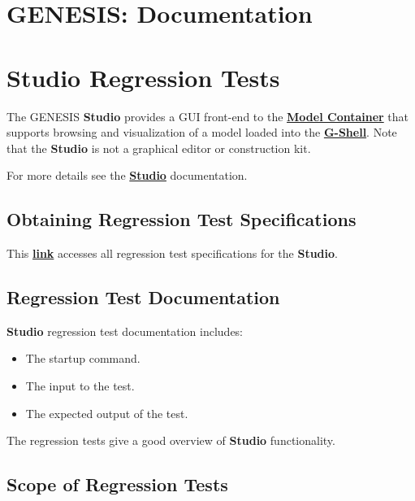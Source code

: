 \documentclass[12pt]{article}
\begin{document}
\section*{GENESIS: Documentation}

\section*{Studio Regression Tests}

The GENESIS {\bf Studio} provides a GUI front-end to the \href{../model-container/model-container.tex}{\bf Model Container} that supports browsing and visualization of a model loaded into the \href{../gshell/gshell.tex}{\bf G-Shell}. Note that the {\bf Studio} is not a graphical editor or construction kit.

For more details see the \href{../model-container/model-container.tex}{\bf Studio} documentation.

\subsection*{Obtaining Regression Test Specifications}

This \href{http://neurospaces.sourceforge.net/neurospaces_project/studio/tests/html/index.html}{\bf link} accesses all regression test specifications for the {\bf Studio}.

\subsection*{Regression Test Documentation}

{\bf Studio} regression test documentation includes:
\begin{itemize}
\item The startup command.
\item The input to the test.
\item The expected output of the test.
\end{itemize}
The regression tests give a good overview of {\bf Studio} functionality.

\subsection*{Scope of Regression Tests}
\end{document}
